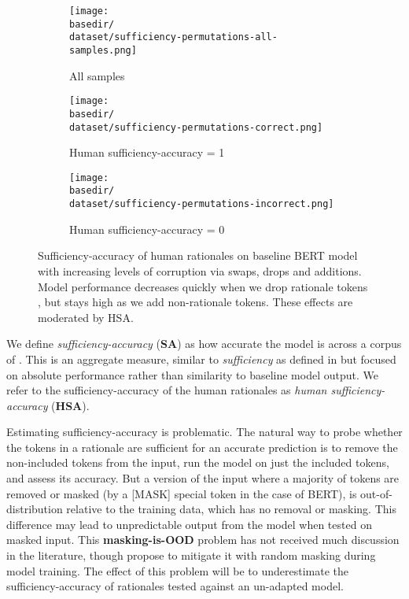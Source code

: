 \def \dataset {multirc}
\def \basedir {new_plots}
\begin{figure*}[h]
\centering
\begin{subfigure}[t]{0.41\textwidth}
    \centering
    \texttt{[image: \\basedir/\\dataset/sufficiency-permutations-all-samples.png]}
    \caption{All samples}
    \label{fig:multirc_perturbation_plots_all}
\end{subfigure}
\begin{subfigure}[t]{0.28\textwidth}
    \centering
    \texttt{[image: \\basedir/\\dataset/sufficiency-permutations-correct.png]}
    \caption{Human sufficiency-accuracy = 1}
    \label{fig:multirc_perturbation_plots_suffacc_1}
\end{subfigure}
\begin{subfigure}[t]{0.28\textwidth}
    \centering
    \texttt{[image: \\basedir/\\dataset/sufficiency-permutations-incorrect.png]}
    \caption{Human sufficiency-accuracy = 0}
    \label{fig:multirc_perturbation_plots_suffacc_0}
\end{subfigure}
\caption{Sufficiency-accuracy of human rationales on baseline BERT model with increasing levels of corruption via swaps, drops and additions.
Model performance decreases quickly when we drop rationale tokens
, but stays high as we add non-rationale tokens.
These effects are moderated by HSA.}
\label{fig:multirc_perturbation_plots}
\end{figure*}

We define \textit{sufficiency-accuracy} (\textbf{SA}) as how accurate the model is across a corpus of \rationalizedinput.
This is an aggregate measure, similar to \textit{sufficiency} as defined in \citet{deyoung_eraser_2019} but focused on absolute performance rather than similarity to baseline model output.
We refer to the sufficiency-accuracy of the human rationales as \textit{human sufficiency-accuracy} (\textbf{HSA}).

Estimating sufficiency-accuracy is problematic. The natural way to probe whether the tokens in a rationale are sufficient for an accurate prediction is to remove the non-included tokens from the input, run the model on just the included tokens, and assess its accuracy. But a version of the input where a majority of tokens are removed or masked (by a [MASK] special token in the case of BERT), is out-of-distribution relative to the training data, which has no removal or masking. This difference may lead to unpredictable output from the model when tested on masked input. This \textbf{masking-is-OOD} problem has not received much discussion in the literature, though \citet{jacovi_aligning_2021} propose to mitigate it with random masking during model training. The effect of this problem will be to underestimate the sufficiency-accuracy of rationales tested against an un-adapted model. 

